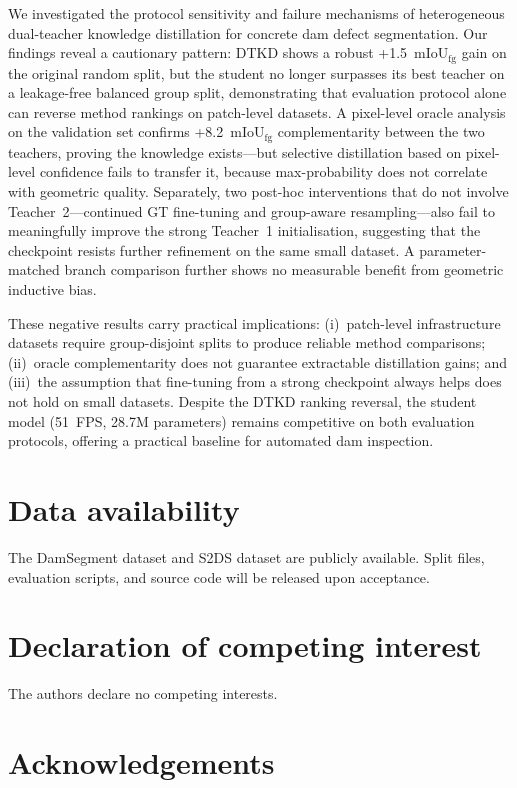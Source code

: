 \documentclass[review,authoryear]{elsarticle}
\begin{document}
We investigated the protocol sensitivity and failure mechanisms of heterogeneous dual-teacher knowledge distillation for concrete dam defect segmentation.
Our findings reveal a cautionary pattern: DTKD shows a robust +1.5~mIoU$_{\text{fg}}$ gain on the original random split, but the student no longer surpasses its best teacher on a leakage-free balanced group split, demonstrating that evaluation protocol alone can reverse method rankings on patch-level datasets.
A pixel-level oracle analysis on the validation set confirms +8.2~mIoU$_{\text{fg}}$ complementarity between the two teachers, proving the knowledge exists---but selective distillation based on pixel-level confidence fails to transfer it, because max-probability does not correlate with geometric quality.
Separately, two post-hoc interventions that do not involve Teacher~2---continued GT fine-tuning and group-aware resampling---also fail to meaningfully improve the strong Teacher~1 initialisation, suggesting that the checkpoint resists further refinement on the same small dataset.
A parameter-matched branch comparison further shows no measurable benefit from geometric inductive bias.

These negative results carry practical implications: (i)~patch-level infrastructure datasets require group-disjoint splits to produce reliable method comparisons; (ii)~oracle complementarity does not guarantee extractable distillation gains; and (iii)~the assumption that fine-tuning from a strong checkpoint always helps does not hold on small datasets.
Despite the DTKD ranking reversal, the student model (51~FPS, 28.7M parameters) remains competitive on both evaluation protocols, offering a practical baseline for automated dam inspection.

\section*{Data availability}

The DamSegment dataset \citep{damsegment2026} and S2DS dataset \citep{s2ds2021} are publicly available. Split files, evaluation scripts, and source code will be released upon acceptance.

\section*{Declaration of competing interest}

The authors declare no competing interests.

\section*{Acknowledgements}
\end{document}
